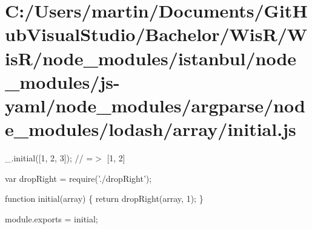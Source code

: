 \hypertarget{_c_1_2_users_2martin_2_documents_2_git_hub_visual_studio_2_bachelor_2_wis_r_2_wis_r_2node_moduleedfc6962c2cbc6d48be622a62069349c}{}\section{C\+:/\+Users/martin/\+Documents/\+Git\+Hub\+Visual\+Studio/\+Bachelor/\+Wis\+R/\+Wis\+R/node\+\_\+modules/istanbul/node\+\_\+modules/js-\/yaml/node\+\_\+modules/argparse/node\+\_\+modules/lodash/array/initial.\+js}
\+\_\+.\+initial(\mbox{[}1, 2, 3\mbox{]}); // =$>$ \mbox{[}1, 2\mbox{]}


\begin{DoxyCodeInclude}
var dropRight = require(\textcolor{stringliteral}{'./dropRight'});

\textcolor{keyword}{function} initial(array) \{
  \textcolor{keywordflow}{return} dropRight(array, 1);
\}

module.exports = initial;
\end{DoxyCodeInclude}
 